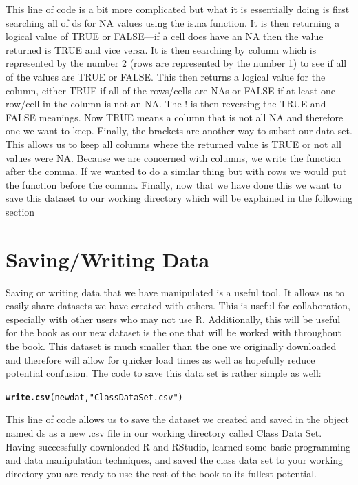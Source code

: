 \documentclass[11pt,openany]{book}\usepackage[]{graphicx}\usepackage[]{color}
\makeatletter
\newcommand{\hlstr}[1]{\textcolor[rgb]{0.192,0.494,0.8}{#1}}%
\newcommand{\hlstd}[1]{\textcolor[rgb]{0.345,0.345,0.345}{#1}}%
\newcommand{\hlkwd}[1]{\textcolor[rgb]{0.737,0.353,0.396}{\textbf{#1}}}%
\newenvironment{kframe}{%
 \def\at@end@of@kframe{}%
 \ifinner\ifhmode%
  \def\at@end@of@kframe{\end{minipage}}%
  \begin{minipage}{\columnwidth}%
 \fi\fi%
 \def\FrameCommand##1{\hskip\@totalleftmargin \hskip-\fboxsep
 \colorbox{shadecolor}{##1}\hskip-\fboxsep
     \hskip-\linewidth \hskip-\@totalleftmargin \hskip\columnwidth}%
 \MakeFramed {\advance\hsize-\width
   \@totalleftmargin\z@ \linewidth\hsize
   \@setminipage}}%
 {\par\unskip\endMakeFramed%
 \at@end@of@kframe}
\newenvironment{knitrout}{}{} %
\renewenvironment{knitrout}{\begin{singlespace}}{\end{singlespace}}
\makeatother
\begin{document}
This line of code is a bit more complicated but what it is essentially doing is first searching all of ds for NA values using the is.na function. It is then returning a logical value of TRUE or FALSE---if a cell does have an NA then the value returned is TRUE and vice versa. It is then searching by column which is represented by the number 2 (rows are represented by the number 1) to see if all of the values are TRUE or FALSE. This then returns a logical value for the column, either TRUE if all of the rows/cells are NAs or FALSE if at least one row/cell in the column is not an NA. The ! is then reversing the TRUE and FALSE meanings. Now TRUE means a column that is not all NA and therefore one we want to keep. Finally, the brackets are another way to subset our data set. This allows us to keep all columns where the returned value is TRUE or not all values were NA. Because we are concerned with columns, we write the function after the comma. If we wanted to do a similar thing but with rows we would put the function before the comma. Finally, now that we have done this we want to save this dataset to our working directory which will be explained in the following section

\section{Saving/Writing Data}

Saving or writing data that we have manipulated is a useful tool. It allows us to easily share datasets we have created with others. This is useful for collaboration, especially with other users who may not use R. Additionally, this will be useful for the book as our new dataset is the one that will be worked with throughout the book. This dataset is much smaller than the one we originally downloaded and therefore will allow for quicker load times as well as hopefully reduce potential confusion. The code to save this data set is rather simple as well:

\begin{knitrout}
\color{fgcolor}\begin{kframe}
\begin{alltt}
\hlkwd{write.csv}\hlstd{(newdat,} \hlstr{"Class Data Set.csv"}\hlstd{)}
\end{alltt}
\end{kframe}
\end{knitrout}

This line of code allows us to save the dataset we created and saved in the object named ds as a new .csv file in our working directory called Class Data Set. Having successfully downloaded R and RStudio, learned some basic programming and data manipulation techniques, and saved the class data set to your working directory you are ready to use the rest of the book to its fullest potential.  


\end{document}
